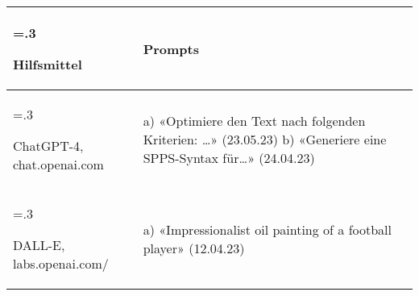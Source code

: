 

\begin{table}[ht]
\begin{tabularx}{\textwidth}{
    >{\hsize=.3\hsize\raggedright\arraybackslash}X
    >{\raggedright\arraybackslash}X}
        \hline
            \textbf{Hilfsmittel} & \textbf{Prompts}\\
        \hline
        ChatGPT-4, chat.openai.com & a) «Optimiere den Text nach folgenden Kriterien: …» (23.05.23) \newline b) «Generiere eine SPPS-Syntax für…» (24.04.23)\\
        \hline
        DALL-E, labs.openai.com/  & a) «Impressionalist oil painting of a football player» (12.04.23) \\
        \hline
\end{tabularx}
\end{table}